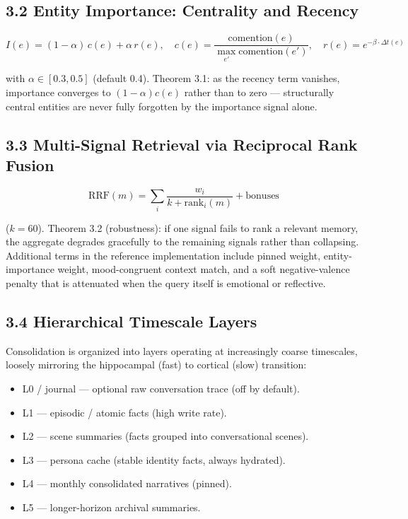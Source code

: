 \documentclass[]{article}
\begin{document}
\hypertarget{entity-importance}{%
\subsection{\texorpdfstring{\textbf{3.2 Entity Importance: Centrality and
Recency}}{3.2 Entity Importance: Centrality and Recency}}\label{entity-importance}}

\[
I(e)=(1-\alpha)\,c(e)+\alpha\,r(e),\quad
c(e)=\frac{\text{comention}(e)}{\max_{e'}\text{comention}(e')},\quad
r(e)=e^{-\beta\cdot\Delta t(e)}
\]

with \(\alpha\in[0.3,0.5]\) (default 0.4). Theorem 3.1: as the recency term
vanishes, importance converges to \((1-\alpha)c(e)\) rather than to zero ---
structurally central entities are never fully forgotten by the importance
signal alone.

\hypertarget{multi-signal-retrieval}{%
\subsection{\texorpdfstring{\textbf{3.3 Multi-Signal Retrieval via
Reciprocal Rank
Fusion}}{3.3 Multi-Signal Retrieval via Reciprocal Rank Fusion}}\label{multi-signal-retrieval}}

\[
\text{RRF}(m)=\sum_i\frac{w_i}{k+\text{rank}_i(m)}+\text{bonuses}
\]

(\(k=60\)). Theorem 3.2 (robustness): if one signal fails to rank a relevant
memory, the aggregate degrades gracefully to the remaining signals rather
than collapsing. Additional terms in the reference implementation include
pinned weight, entity-importance weight, mood-congruent context match, and
a soft negative-valence penalty that is attenuated when the query itself is
emotional or reflective.

\hypertarget{hierarchical-timescale}{%
\subsection{\texorpdfstring{\textbf{3.4 Hierarchical Timescale
Layers}}{3.4 Hierarchical Timescale Layers}}\label{hierarchical-timescale}}

Consolidation is organized into layers operating at increasingly coarse
timescales, loosely mirroring the hippocampal (fast) to cortical (slow)
transition:

\begin{itemize}
\item L0 / journal --- optional raw conversation trace (off by default).
\item L1 --- episodic / atomic facts (high write rate).
\item L2 --- scene summaries (facts grouped into conversational scenes).
\item L3 --- persona cache (stable identity facts, always hydrated).
\item L4 --- monthly consolidated narratives (pinned).
\item L5 --- longer-horizon archival summaries.
\end{itemize}
\end{document}
